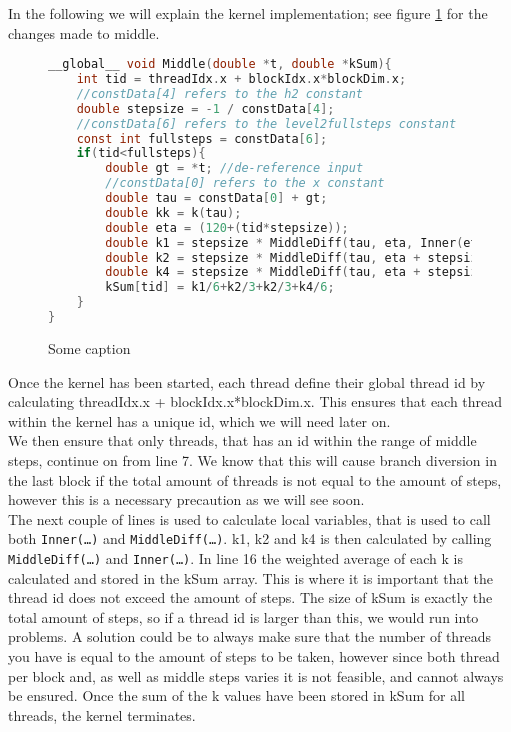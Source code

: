 In the following we will explain the kernel implementation; see figure \ref{fig:middlepar} for the changes made to middle. \\
\begin{figure}[H]
\begin{lstlisting}[language=c]
__global__ void Middle(double *t, double *kSum){
	int tid = threadIdx.x + blockIdx.x*blockDim.x;
	//constData[4] refers to the h2 constant
	double stepsize = -1 / constData[4]; 
	//constData[6] refers to the level2fullsteps constant
	const int fullsteps = constData[6]; 
	if(tid<fullsteps){
		double gt = *t; //de-reference input
		//constData[0] refers to the x constant
		double tau = constData[0] + gt; 
		double kk = k(tau);
		double eta = (120+(tid*stepsize));
		double k1 = stepsize * MiddleDiff(tau, eta, Inner(eta, gt, kk).y);
		double k2 = stepsize * MiddleDiff(tau, eta + stepsize/2, Inner(eta + stepsize/2, gt, kk).y);		
		double k4 = stepsize * MiddleDiff(tau, eta + stepsize, Inner(eta + stepsize, gt, kk).y);
		kSum[tid] = k1/6+k2/3+k2/3+k4/6;
	}
}
\end{lstlisting}
\caption{Some caption}
\label{fig:middlepar}
\end{figure}

Once the kernel has been started, each thread define their global thread id by calculating threadIdx.x + blockIdx.x*blockDim.x. This ensures that each thread within the kernel has a unique id, which we will need later on.\\

We then ensure that only threads, that has an id within the range of middle steps, continue on from line 7. We know that this will cause branch diversion in the last block if the total amount of threads is not equal to the amount of steps, however this is a necessary precaution as we will see soon.\\

The next couple of lines is used to calculate local variables, that is used to call both \texttt{Inner(…)} and \texttt{MiddleDiff(…)}. k1, k2 and k4 is then calculated by calling \texttt{MiddleDiff(…)} and \texttt{Inner(…)}. In line 16 the weighted average of each k is calculated and stored in the kSum array. This is where it is important that the thread id does not exceed the amount of steps. The size of kSum is exactly the total amount of steps, so if a thread id is larger than this, we would run into problems. A solution could be to always make sure that the number of threads you have is equal to the amount of steps to be taken, however since both thread per block and, as well as middle steps varies it is not feasible, and cannot always be ensured. Once the sum of the k values have been stored in kSum for all threads, the kernel terminates.

